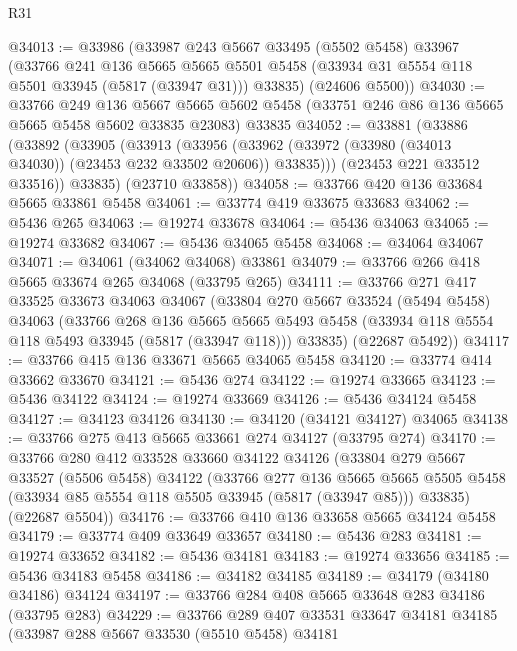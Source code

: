 \begin{lexlean}{R31}
\begin{coremodule}
@34013 := @33986
    (@33987
      @243
      @5667
      @33495
      (@5502 @5458)
      @33967
      (@33766
        @241
        @136
        @5665
        @5665
        @5501
        @5458
        (@33934 @31 @5554 @118 @5501 @33945 (@5817 (@33947 @31)))
        @33835)
      (@24606 @5500))
@34030 := @33766
    @249
    @136
    @5667
    @5665
    @5602
    @5458
    (@33751 @246 @86 @136 @5665 @5665 @5458 @5602 @33835 @23083)
    @33835
@34052 := @33881
    (@33886
      (@33892
        (@33905
          (@33913
            (@33956 (@33962 (@33972 (@33980 (@34013 @34030)) (@23453 @232 @33502 @20606)) @33835)))
          (@23453 @221 @33512 @33516))
        @33835)
      (@23710 @33858))
@34058 := @33766 @420 @136 @33684 @5665 @33861 @5458
@34061 := @33774 @419 @33675 @33683
@34062 := @5436 @265
@34063 := @19274 @33678
@34064 := @5436 @34063
@34065 := @19274 @33682
@34067 := @5436 @34065 @5458
@34068 := @34064 @34067
@34071 := @34061 (@34062 @34068) @33861
@34079 := @33766 @266 @418 @5665 @33674 @265 @34068 (@33795 @265)
@34111 := @33766
    @271
    @417
    @33525
    @33673
    @34063
    @34067
    (@33804
      @270
      @5667
      @33524
      (@5494 @5458)
      @34063
      (@33766
        @268
        @136
        @5665
        @5665
        @5493
        @5458
        (@33934 @118 @5554 @118 @5493 @33945 (@5817 (@33947 @118)))
        @33835)
      (@22687 @5492))
@34117 := @33766 @415 @136 @33671 @5665 @34065 @5458
@34120 := @33774 @414 @33662 @33670
@34121 := @5436 @274
@34122 := @19274 @33665
@34123 := @5436 @34122
@34124 := @19274 @33669
@34126 := @5436 @34124 @5458
@34127 := @34123 @34126
@34130 := @34120 (@34121 @34127) @34065
@34138 := @33766 @275 @413 @5665 @33661 @274 @34127 (@33795 @274)
@34170 := @33766
    @280
    @412
    @33528
    @33660
    @34122
    @34126
    (@33804
      @279
      @5667
      @33527
      (@5506 @5458)
      @34122
      (@33766
        @277
        @136
        @5665
        @5665
        @5505
        @5458
        (@33934 @85 @5554 @118 @5505 @33945 (@5817 (@33947 @85)))
        @33835)
      (@22687 @5504))
@34176 := @33766 @410 @136 @33658 @5665 @34124 @5458
@34179 := @33774 @409 @33649 @33657
@34180 := @5436 @283
@34181 := @19274 @33652
@34182 := @5436 @34181
@34183 := @19274 @33656
@34185 := @5436 @34183 @5458
@34186 := @34182 @34185
@34189 := @34179 (@34180 @34186) @34124
@34197 := @33766 @284 @408 @5665 @33648 @283 @34186 (@33795 @283)
@34229 := @33766
    @289
    @407
    @33531
    @33647
    @34181
    @34185
    (@33987
      @288
      @5667
      @33530
      (@5510 @5458)
      @34181

\end{coremodule}
\end{lexlean}
